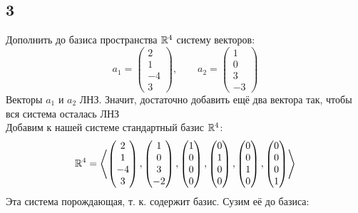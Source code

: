 \subsection{3}
Дополнить до базиса пространства $ \mathbb{R}^4 $ систему векторов:
$$ a_1 =
\begin{pmatrix}
	2 \\
    1 \\
    -4 \\
    3
\end{pmatrix}, \qquad a_2 =
\begin{pmatrix}
	1 \\
    0 \\
    3 \\
    -3
\end{pmatrix} $$
Векторы $ a_1 $ и $ a_2 $ ЛНЗ. Значит, достаточно добавить ещё два вектора так, чтобы вся система осталась ЛНЗ \\
Добавим к нашей системе стандартный базис $ \mathbb{R}^4 $:
$$ \mathbb{R}^4 = \left\langle
\begin{pmatrix}
	2 \\
    1 \\
    -4 \\
    3
\end{pmatrix},
\begin{pmatrix}
	1 \\
    0 \\
    3 \\
    -2
\end{pmatrix},
\begin{pmatrix}
	1 \\
    0 \\
    0 \\
    0
\end{pmatrix},
\begin{pmatrix}
	0 \\
    1 \\
    0 \\
    0
\end{pmatrix},
\begin{pmatrix}
	0 \\
    0 \\
    1 \\
    0
\end{pmatrix},
\begin{pmatrix}
	0 \\
    0 \\
    0 \\
    1
\end{pmatrix} \right\rangle $$
Эта система порождающая, т. к. содержит базис. Сузим её до базиса:

